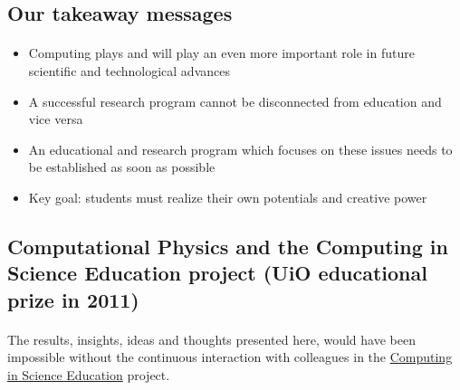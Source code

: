 \documentclass[%
twoside,                 %
final,                   %
10pt]{article}
\begin{document}
\subsection{Our takeaway messages}

\paragraph{}
\begin{itemize}
\item Computing plays and will play an even more important role in future scientific and technological advances

\item A successful research program cannot be disconnected from education and vice versa

\item An educational and research program which focuses on these issues needs to be established as soon as possible

\item Key goal: students must realize their own potentials and creative power
\end{itemize}

\noindent




\subsection{Computational Physics and  the Computing in Science Education project (UiO educational prize in 2011)}


\paragraph{}
The results, insights, ideas and thoughts presented here, would have been impossible without the continuous interaction with colleagues in the \href{{http://www.mn.uio.no/english/about/collaboration/cse/}}{Computing in Science Education} project.



\end{document}
